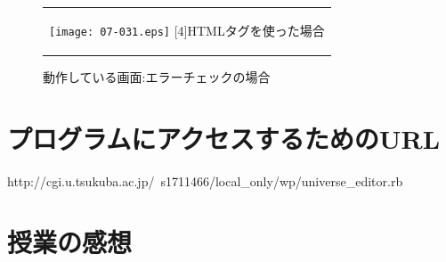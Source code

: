 \documentclass[12pt,a4paper]{jarticle}
\begin{document}
\begin{ttfamily}
\begin{figure}[htbp]
\begin{center}
\begin{tabular}{c}
      \begin{minipage}{0.53\hsize}
        \begin{center}
          \texttt{[image: 07-031.eps]}
          \hspace{1.6cm} [4]HTMLタグを使った場合
        \end{center}
      \end{minipage}

    \end{tabular}
    \caption{動作している画面:エラーチェックの場合}
    \label{fig:dsplay}
  \end{center}
\end{figure}

\section{プログラムにアクセスするためのURL}
http://cgi.u.tsukuba.ac.jp/~s1711466/local_only/wp/universe_editor.rb

\section{授業の感想}



\end{ttfamily}
\end{document}
